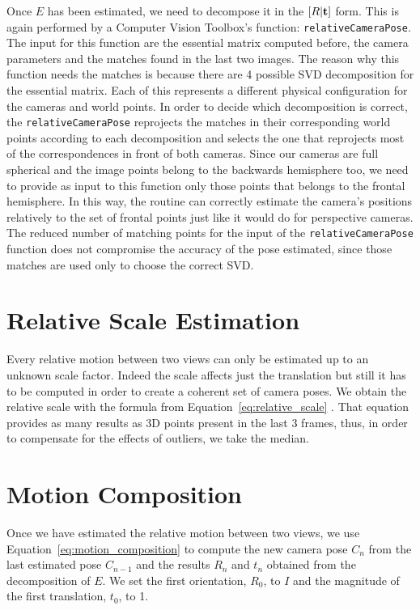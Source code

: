Once $E$ has been estimated, we need to decompose it in the 
\( [R|\mathbf{t} ] \) form. This is again performed by a Computer Vision 
Toolbox's function: {\tt relativeCameraPose}.
The input for this function are the essential matrix computed before, the 
camera parameters and the matches found in the last two images.
The reason why this function needs the matches is because there are 4 possible 
SVD decomposition for the essential matrix. Each of this represents a 
different physical configuration for the cameras and world points.
In order to decide which decomposition is correct, the {\tt relativeCameraPose}
reprojects the matches in their corresponding world points according to each 
decomposition and selects the one that reprojects most of the correspondences in 
front of both cameras.
Since our cameras are full spherical and the image points belong to the 
backwards hemisphere too, we need to provide as input to this function only 
those points that belongs to the frontal hemisphere. In this way, the routine 
can correctly estimate the camera's positions relatively to the set of frontal
points just like it would do for perspective cameras.
The reduced number of matching points for the input of the 
{\tt relativeCameraPose} function does not compromise the accuracy of the pose 
estimated, since those matches are used only to choose the 
correct SVD.

\section{Relative Scale Estimation}
Every relative motion between two views can only be estimated up to an unknown 
scale factor. Indeed the scale affects just the translation but still it has to 
be computed in order to create a coherent set of camera poses.
We obtain the relative scale with the formula from 
Equation~\ref{eq:relative_scale} \cite{scaramuzzaVisualOdometryI}.
That equation provides as many results as 3D points present in the last 3 
frames, thus, in order to compensate for the effects of outliers, we take the 
median.

\section{Motion Composition}
Once we have estimated the relative motion between two views, we use 
Equation~\ref{eq:motion_composition} to compute the new camera pose $C_n$ from 
the last estimated pose $C_{n-1}$ and the results $R_{n}$ and $t_n$ obtained 
from the decomposition of $E$.
We set the first orientation, $R_0$, to $I$ and the magnitude of the first 
translation, $t_0$, to 1.


